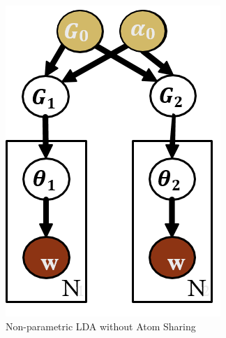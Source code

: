 \documentclass[a4paper]{oblivoir}
\begin{document}
\begin{figure}[ht] \centering 
\begin{center}
\includegraphics[scale=0.6]{fig13_12.png} 
\caption{Non-parametric LDA without Atom Sharing}
\label{fig:13-14}
\end{center}
\end{figure}
\end{document}
